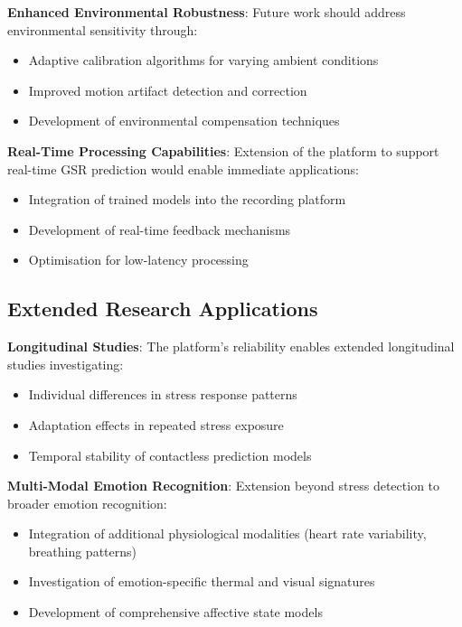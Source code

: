\textbf{Enhanced Environmental Robustness}: Future work should address environmental sensitivity through:

\begin{itemize}
\item Adaptive calibration algorithms for varying ambient conditions
\item Improved motion artifact detection and correction
\item Development of environmental compensation techniques
\end{itemize}

\textbf{Real-Time Processing Capabilities}: Extension of the platform to support real-time GSR prediction would enable immediate applications:

\begin{itemize}
\item Integration of trained models into the recording platform
\item Development of real-time feedback mechanisms
\item Optimisation for low-latency processing
\end{itemize}

\subsection{Extended Research Applications}

\textbf{Longitudinal Studies}: The platform's reliability enables extended longitudinal studies investigating:

\begin{itemize}
\item Individual differences in stress response patterns
\item Adaptation effects in repeated stress exposure
\item Temporal stability of contactless prediction models
\end{itemize}

\textbf{Multi-Modal Emotion Recognition}: Extension beyond stress detection to broader emotion recognition:

\begin{itemize}
\item Integration of additional physiological modalities (heart rate variability, breathing patterns)
\item Investigation of emotion-specific thermal and visual signatures
\item Development of comprehensive affective state models
\end{itemize}

